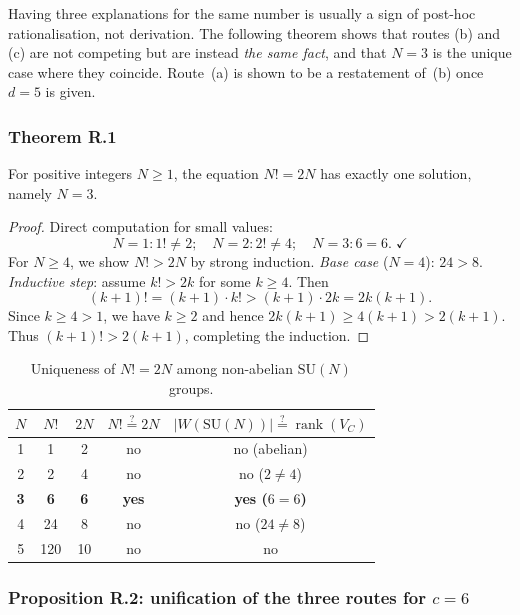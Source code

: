 Having three explanations for the same number is usually a sign of
post-hoc rationalisation, not derivation.  The following theorem shows
that routes (b) and (c) are not competing but are instead
\emph{the same fact}, and that $N=3$ is the unique case where they
coincide.  Route~(a) is shown to be a restatement of~(b) once
$d=5$ is given.

\subsubsection{Theorem R.1}

\begin{theorem}
  \label{thm:factdouble}
  For positive integers $N\geq 1$, the equation $N! = 2N$ has
  exactly one solution, namely $N=3$.
\end{theorem}

\begin{proof}
Direct computation for small values:
\[
  N=1\colon 1!\neq 2;\quad
  N=2\colon 2!\neq 4;\quad
  N=3\colon 6=6.\;\checkmark
\]
For $N\geq 4$, we show $N! > 2N$ by strong induction.
\emph{Base case} ($N=4$): $24>8$. \checkmark
\emph{Inductive step}: assume $k!>2k$ for some $k\geq 4$.  Then
\[
  (k+1)! = (k+1)\cdot k! > (k+1)\cdot 2k = 2k(k+1).
\]
Since $k\geq 4>1$, we have $k\geq 2$ and hence
$2k(k+1)\geq 4(k+1)>2(k+1)$.
Thus $(k+1)!>2(k+1)$, completing the induction.
\end{proof}

\begin{table}[h]
\centering
\small
\renewcommand{\arraystretch}{1.2}
\begin{tabular}{ccccc}
\toprule
$N$ & $N!$ & $2N$ & $N!\stackrel{?}{=}2N$ & $|W(\mathrm{SU}(N))|
  \stackrel{?}{=}\operatorname{rank}(V_C)$ \\
\midrule
1 & 1 & 2 & no & no (abelian) \\
2 & 2 & 4 & no & no ($2\neq 4$) \\
\textbf{3} & \textbf{6} & \textbf{6} & \textbf{yes} &
  \textbf{yes ($6=6$)} \\
4 & 24 & 8 & no & no ($24\neq 8$) \\
5 & 120 & 10 & no & no \\
\bottomrule
\end{tabular}
\caption{Uniqueness of $N!=2N$ among non-abelian $\mathrm{SU}(N)$ groups.}
\label{tab:factdouble}
\end{table}

\subsubsection{Proposition R.2: unification of the three routes for $c=6$}

